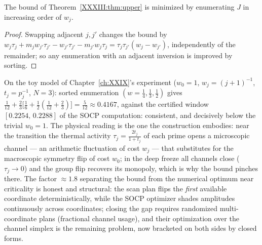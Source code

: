 \begin{proposition}\label{XXXIII:prop:order}
The bound of Theorem~\ref{XXXIII:thm:upper} is minimized by enumerating $J$ in increasing order
of $w_j$.
\end{proposition}

\begin{proof}
Swapping adjacent $j,j'$ changes the bound by
$w_j\tau_j+m_j w_{j'}\tau_{j'}-w_{j'}\tau_{j'}-m_{j'}w_j\tau_j
=\tau_j\tau_{j'}(w_j-w_{j'})$, independently of the remainder; so any enumeration with an
adjacent inversion is improved by sorting.
\end{proof}

\begin{remark}\label{XXXIII:rem:numerics}
On the toy model of Chapter~\ref{ch:XXIX}'s experiment ($w_0=1$, $w_j=(j+1)^{-1}$,
$t_j=p_j^{-1}$, $N=3$): sorted enumeration $(w=\tfrac14,\tfrac13,\tfrac12)$ gives
$\tfrac1{12}+\tfrac23\bigl[\tfrac16+\tfrac12(\tfrac1{12}+\tfrac23)\bigr]
=\tfrac5{12}\approx0.4167$, against the certified window $[0.2254,\,0.2288]$ of the SOCP
computation: consistent, and decisively below the trivial $w_0=1$. The physical reading
is the one the construction embodies: near the transition the thermal activity
$\tau_j=\frac{2t_j}{1+t_j}$ of each prime opens a microscopic channel --- an arithmetic
fluctuation of cost $w_j$ --- that substitutes for the macroscopic symmetry flip of cost
$w_0$; in the deep freeze all channels close ($\tau_j\to0$) and the group flip recovers
its monopoly, which is why the bound pinches there. The factor $\approx1.8$ separating
the bound from the numerical optimum near criticality is honest and structural: the scan
plan flips the \emph{first} available coordinate deterministically, while the SOCP
optimizer shades amplitudes continuously across coordinates; closing the gap requires
randomized multi-coordinate plans (fractional channel usage), and their optimization over
the channel simplex is the remaining problem, now bracketed on both sides by closed
forms.
\end{remark}

